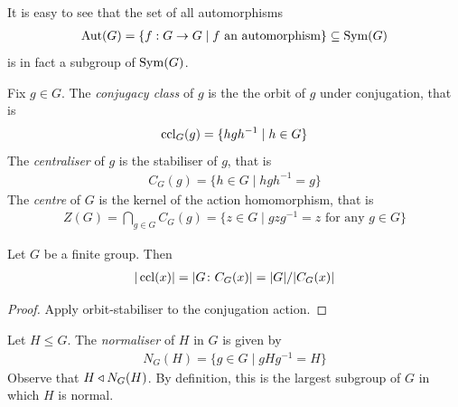 \documentclass{../template/note}
\begin{document}
    \begin{remark*}
        It is easy to see that the set of all automorphisms
        \begin{align*}
            \operatorname{Aut}(G) = \{f: G \to G \mid f \text{ an automorphism}\} \subseteq \operatorname{Sym}(G)
        \end{align*}
        is in fact a subgroup of $\operatorname{Sym}(G)$.        
    \end{remark*}
    
    \begin{definition}
        Fix $g \in G$. The \emph{conjugacy class} of $g$ is the the orbit of $g$ under conjugation, that is
        \begin{align*}
            \operatorname{ccl}_G(g) = \{hgh^{-1} \mid h \in G\}
        \end{align*}
        The \emph{centraliser} of $g$ is the stabiliser of $g$, that is
        \begin{align*}
            C_G(g) = \{h \in G \mid hgh^{-1} = g\}
        \end{align*}
        The \emph{centre} of $G$ is the kernel of the action homomorphism, that is
        \begin{align*}
            Z(G) = \bigcap_{g \in G} C_G(g) = \{z \in G \mid gzg^{-1} = z \text{ for any } g \in G\}
        \end{align*} 
    \end{definition}
    
    \begin{proposition}
        Let $G$ be a finite group. Then
        \begin{align*}
            |\operatorname{ccl}(x)| = |G\colon C_G(x)| = |G|/|C_G(x)|
        \end{align*}
    \end{proposition}
    
    \begin{proof}
        Apply orbit-stabiliser to the conjugation action.
    \end{proof}
    
    \begin{definition}[Normaliser]
        Let $H \leq G$. The \emph{normaliser} of $H$ in $G$ is given by
        \begin{align*}
            N_G(H) = \{g \in G \mid gHg^{-1} = H\}
        \end{align*}
        Observe that $H \triangleleft N_G(H)$. By definition, this is the largest subgroup of $G$ in which $H$ is normal.        
    \end{definition}
    
\end{document}
